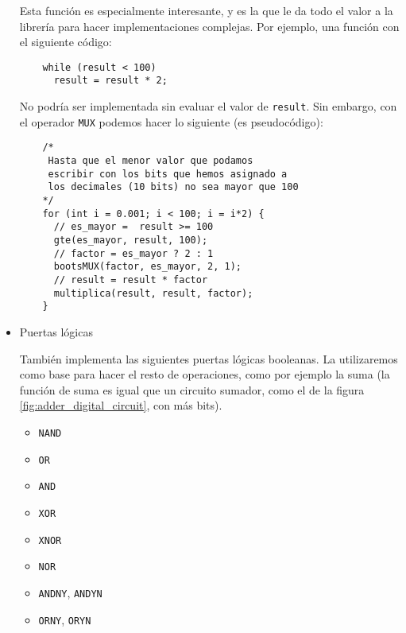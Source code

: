 \begin{itemize}
  Esta función es especialmente interesante, y es la que le da todo el valor a la librería para hacer implementaciones complejas. Por ejemplo, una función con el siguiente código:

  \begin{verbatim}
    while (result < 100)
      result = result * 2;
  \end{verbatim}

  No podría ser implementada sin evaluar el valor de \verb|result|. Sin embargo, con el operador \verb|MUX| podemos hacer lo siguiente (es pseudocódigo):

  \begin{verbatim}
    /*
     Hasta que el menor valor que podamos
     escribir con los bits que hemos asignado a
     los decimales (10 bits) no sea mayor que 100
    */
    for (int i = 0.001; i < 100; i = i*2) {
      // es_mayor =  result >= 100
      gte(es_mayor, result, 100);
      // factor = es_mayor ? 2 : 1
      bootsMUX(factor, es_mayor, 2, 1);
      // result = result * factor
      multiplica(result, result, factor);
    }
  \end{verbatim}

  \item Puertas lógicas

  También implementa las siguientes puertas lógicas booleanas. La utilizaremos como base para hacer el resto de operaciones, como por ejemplo la suma (la función de suma es igual que un circuito sumador, como el de la figura \ref{fig:adder_digital_circuit}, con más bits).

  \begin{itemize}
    \item \verb|NAND|

    \item \verb|OR|

    \item \verb|AND|

    \item \verb|XOR|

    \item \verb|XNOR|

    \item \verb|NOR|

    \item \verb|ANDNY|, \verb|ANDYN|

    \item \verb|ORNY|, \verb|ORYN|

  \end{itemize}

\end{itemize}

